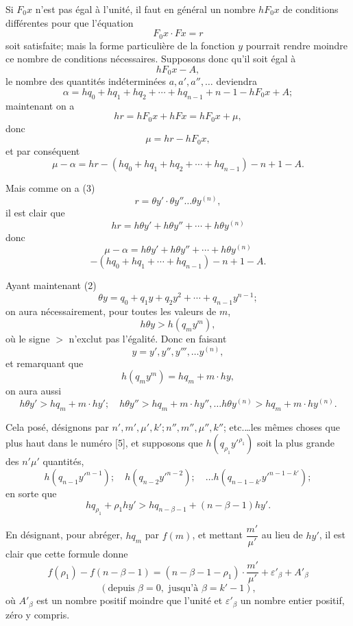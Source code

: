 \documentclass{article}
\begin{document}
Si $F_0 x$ n'est pas égal à l'unité, il faut en général un nombre $hF_0 x$ de conditions différentes pour que l'équation
\[ F_0 x \cdot F x = r \]
soit satisfaite; mais la forme particulière de la fonction $y$ pourrait rendre moindre ce nombre de conditions nécessaires. Supposons donc qu'il soit égal à
\[ hF_0 x - A, \tag{75} \]
le nombre des quantités indéterminées $a, a', a'', \ldots$ deviendra
\[ \alpha = hq_0 + hq_1 + hq_2 + \cdots + hq_{n-1} + n - 1 - hF_0 x + A; \tag{76} \]
maintenant on a
\[ hr = hF_0 x + hF x = hF_0 x + \mu, \]
donc
\[ \mu = hr - hF_0 x, \tag{77} \]
et par conséquent
\[ \mu - \alpha = hr - (hq_0 + hq_1 + hq_2 + \cdots + hq_{n-1}) - n + 1 - A. \tag{78} \]

Mais comme on a (3)
\[ r = \theta y' \cdot \theta y'' \ldots \theta y^{(n)}, \]
il est clair que
\[ hr = h\theta y' + h\theta y'' + \cdots + h\theta y^{(n)} \tag{79} \]
donc
\[ \mu - \alpha = h\theta y' + h\theta y'' + \cdots + h\theta y^{(n)} \]
\[ - (hq_0 + hq_1 + \cdots + hq_{n-1}) - n + 1 - A. \tag{80} \]

Ayant maintenant (2)
\[ \theta y = q_0 + q_1 y + q_2 y^{2} + \cdots + q_{n-1} y^{n-1}; \]
on aura nécessairement, pour toutes les valeurs de $m$,
\[ h\theta y > h(q_m y^{m}), \]
où le signe $>$ n'exclut pas l'égalité.
Donc en faisant
\[ y = y', y'', y''', \ldots y^{(n)}, \]
et remarquant que
\[ h(q_m y^{m}) = hq_m + m \cdot hy, \]
on aura aussi
\[ h\theta y' > hq_m + m \cdot hy'; \quad h\theta y'' > hq_m + m \cdot hy'', \ldots h\theta y^{(n)} > hq_m + m \cdot hy^{(n)}. \tag{81} \]

Cela posé, désignons par $n', m', \mu', k'; n'', m'', \mu'', k''$; etc.\ldots les mêmes choses que plus haut dans le numéro [5], et supposons que $h(q_{\rho_1} y'^{\rho_1})$ soit la plus grande des $n'\mu'$ quantités,
\[ h(q_{n-1} y'^{n-1}); \quad h(q_{n-2} y'^{n-2}); \quad \ldots h(q_{n-1-k'} y'^{n-1-k'}); \]
en sorte que
\[ hq_{\rho_1} + \rho_1 hy' > hq_{n-\beta-1} + (n-\beta-1)hy'. \tag{82} \]

En désignant, pour abréger, $hq_m$ par $f(m)$, et mettant $\dfrac{m'}{\mu'}$ au lieu de $hy'$, il est clair que cette formule donne
\[ f(\rho_1) - f(n-\beta-1) = (n-\beta-1-\rho_1) \cdot \frac{m'}{\mu'} + \varepsilon'_\beta + A'_\beta \]
\[ (\text{depuis } \beta = 0, \text{ jusqu'à } \beta = k'-1), \]
où $A'_\beta$ est un nombre positif moindre que l'unité et $\varepsilon'_\beta$ un nombre entier positif, zéro y compris.
\end{document}
